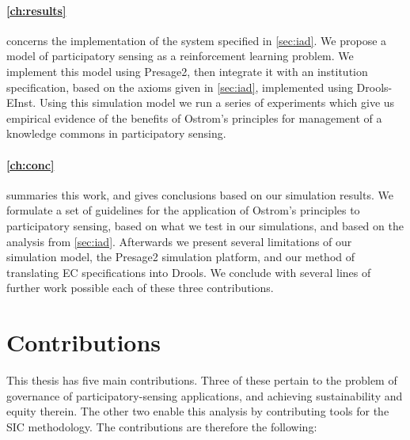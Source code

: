 \paragraph{\autoref{ch:results}} concerns the implementation of the system
specified in \autoref{sec:iad}. We propose a model of participatory sensing as
a reinforcement learning problem. We implement this model using Presage2, then
integrate it with an institution specification, based on the axioms given in
\autoref{sec:iad}, implemented using Drools-EInst. Using this simulation model
we run a series of experiments which give us empirical evidence of the
benefits of Ostrom's principles for management of a knowledge commons in
participatory sensing.

\paragraph{\autoref{ch:conc}}
summaries this work, and gives conclusions based on our simulation results. We formulate a set of guidelines for the application of Ostrom's principles to participatory sensing, based on what we test in our simulations, and based on the analysis from \autoref{sec:iad}. Afterwards we present several limitations of our simulation model, the Presage2 simulation platform, and our method of translating \ac{EC} specifications into Drools. We conclude with several lines of further work possible each of these three contributions.

\section{Contributions}

This thesis has five main contributions. Three of these pertain to the problem of governance of participatory-sensing applications, and achieving sustainability and equity therein. The other two enable this analysis by contributing tools for the \ac{SIC} methodology. The contributions are therefore the following:

